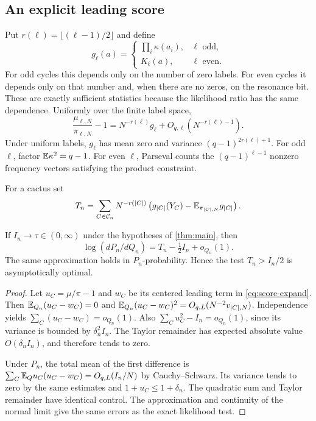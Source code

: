 \subsection{An explicit leading score}
Put $r(\ell)=\lfloor(\ell-1)/2\rfloor$ and define
\[
g_\ell(a)=
\begin{cases}
\prod_i\kappa(a_i),&\ell\text{ odd},\\
K_\ell(a),&\ell\text{ even}.
\end{cases}
\]
For odd cycles this depends only on the number of zero labels.
For even cycles it depends only on that number and, when there are no zeros,
on the resonance bit. These are exactly sufficient statistics because the
likelihood ratio has the same dependence.
Uniformly over the finite label space,
\begin{equation}\label{eq:score-expand}
\frac{\mu_{\ell,N}}{\pi_{\ell,N}}-1
=N^{-r(\ell)}g_\ell+O_{q,\ell}(N^{-r(\ell)-1}).
\end{equation}
Under uniform labels, $g_\ell$ has mean zero and variance
$(q-1)^{2r(\ell)+1}$. For odd $\ell$, factor $\mathbb E\kappa^2=q-1$.
For even $\ell$, Parseval counts the $(q-1)^{\ell-1}$ nonzero frequency
vectors satisfying the product constraint.

For a cactus set
\[
T_n=\sum_{C\in\mathcal C_n}N^{-r(|C|)}
\left(g_{|C|}(Y_C)-\mathbb E_{\pi_{|C|,N}}g_{|C|}\right).
\]
\begin{proposition}\label{prop:score}
If $I_n\to\tau\in(0,\infty)$ under the hypotheses of \cref{thm:main}, then
\[
\log(dP_n/dQ_n)=T_n-\tfrac12 I_n+o_{Q_n}(1).
\]
The same approximation holds in $P_n$-probability. Hence the test
$T_n>I_n/2$ is asymptotically optimal.
\end{proposition}
\begin{proof}
Let $u_C=\mu/\pi-1$ and $w_C$ be its centered leading term in
\eqref{eq:score-expand}. Then
$\mathbb E_{Q_n}(u_C-w_C)=0$ and
$\mathbb E_{Q_n}(u_C-w_C)^2=O_{q,L}(N^{-2}v_{|C|,N})$.
Independence yields $\sum_C(u_C-w_C)=o_{Q_n}(1)$.
Also $\sum_Cu_C^2-I_n=o_{Q_n}(1)$, since its variance is bounded by
$\delta_n^2I_n$. The Taylor remainder has expected absolute value
$O(\delta_nI_n)$, and therefore tends to zero.

Under $P_n$, the total mean of the first difference is
$\sum_C\mathbb E_Q u_C(u_C-w_C)=O_{q,L}(I_n/N)$ by Cauchy--Schwarz.
Its variance tends to zero by the same estimates and $1+u_C\le1+\delta_n$.
The quadratic sum and Taylor remainder have identical control.
The approximation and continuity of the normal limit give the same errors
as the exact likelihood test.
\end{proof}

